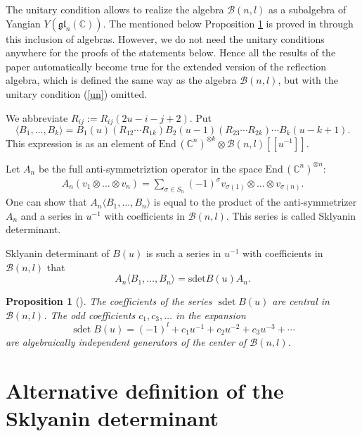 \documentclass[11pt]{article}
\newtheorem{proposition}{Proposition}
\newcommand{\CC}{\mathbb C}    %
\newcommand{\B}{\mathcal B}
\newcommand{\gl}{\mathfrak {gl}}    %
\begin{document}
\begin{remark}  The unitary condition allows to realize the algebra $\B(n,l)$ as a subalgebra of Yangian  $Y(\gl_n(\CC))$. The mentioned below Proposition \ref{MR} is proved in \cite{MR}  through this inclusion of algebras.
However, we do not need the unitary conditions anywhere for the proofs of the statements below. Hence all the results of the paper automatically become true for the extended version of the ref\/lection algebra, which is def\/ined the same way as the algebra  $\B(n,l)$, but with the unitary condition (\ref{un}) omitted.
\end{remark}

We abbreviate  $R_{ij}:=R_{ij}(2u-i-j+2)$.
Put
\[
\langle B_1,\dots, B_k\rangle =B_1(u)(R_{12}\cdots R_{1k})B_2(u-1) (R_{23}\cdots R_{2k})
\cdots B_ k(u-k+1).
\]
This expression  is as an  element of $\text{End}\, (\CC^n)^{\otimes k }\otimes \B(n,l)[[u^{-1}]]$.

Let $A_n$ be the full  anti-symmetriztion operator in the space $\text{End}\, (\CC^n)^{\otimes n }$:
\begin{gather*}
A_n (v_1\otimes \dots\otimes v_n)=\sum_{\sigma\in S_n} (-1)^{\sigma}
v_{\sigma(1)}\otimes \dots \otimes v_{\sigma(n)}.
\end{gather*}
One can show \cite{MR} that $A_n\langle B_1,\dots, B_n\rangle $ is equal to the product of the anti-symmetrizer $A_n$ and a series in $u^{-1}$   with coef\/f\/icients in $\B(n,l)$. This series is called Sklyanin determinant.

\begin{definition} Sklyanin determinant of $B(u)$ is such a  series in $u^{-1}$   with coef\/f\/icients in $\B(n,l)$ that
\[
 A_n \langle B_1,\dots, B_n\rangle =\text{sdet} B(u)A_n.
 \]
 \end{definition}
\begin{proposition}[\cite {MR}]\label{MR} The coefficients of the series $\operatorname{sdet}B(u)$ are  central in $\B(n,l)$. The odd coefficients $c_1,c_3,\dots$ in the expansion
\[
\operatorname{sdet} B(u)=(-1)^l+c_1u^{-1}+c_2u^{-2}+c_3u^{-3}+\cdots
\]
 are algebraically independent generators of the center of  $\B(n,l)$.
 \end{proposition}

\section{Alternative def\/inition of  the Sklyanin determinant}\label{section2}
\end{document}
